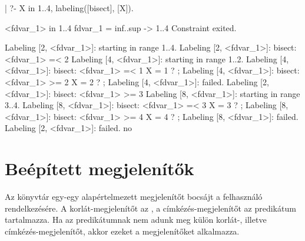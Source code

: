 \begin{prologcode}
| ?- X in 1..4, labeling([bisect], [X]).

<fdvar_1> in 1..4                   fdvar_1 = inf..sup -> 1..4
                                    Constraint exited.        

Labeling [2, <fdvar_1>]: starting in range 1..4.
Labeling [2, <fdvar_1>]: bisect: <fdvar_1> =< 2
        Labeling [4, <fdvar_1>]: starting in range 1..2.
        Labeling [4, <fdvar_1>]: bisect: <fdvar_1> =< 1     
X = 1 ? ;
        Labeling [4, <fdvar_1>]: bisect: <fdvar_1> >= 2
X = 2 ? ;
        Labeling [4, <fdvar_1>]: failed.
Labeling [2, <fdvar_1>]: bisect: <fdvar_1> >= 3
        Labeling [8, <fdvar_1>]: starting in range 3..4.
        Labeling [8, <fdvar_1>]: bisect: <fdvar_1> =< 3
X = 3 ? ;
        Labeling [8, <fdvar_1>]: bisect: <fdvar_1> >= 4
X = 4 ? ;
        Labeling [8, <fdvar_1>]: failed.
Labeling [2, <fdvar_1>]: failed.
no
\end{prologcode}

\section{Beépített megjelenítők}

Az \fdbg könyvtár egy-egy alapértelmezett megjelenítőt bocsájt a felhasználó
rendelkezésére. A korlát-megjelenítőt az , a címkézés-megjelenítőt
az  predikátum tartalmazza. Ha az  predikátumnak
nem adunk meg külön korlát-, illetve címkézés-megjelenítőt, akkor ezeket a megjelenítőket
alkalmazza.

